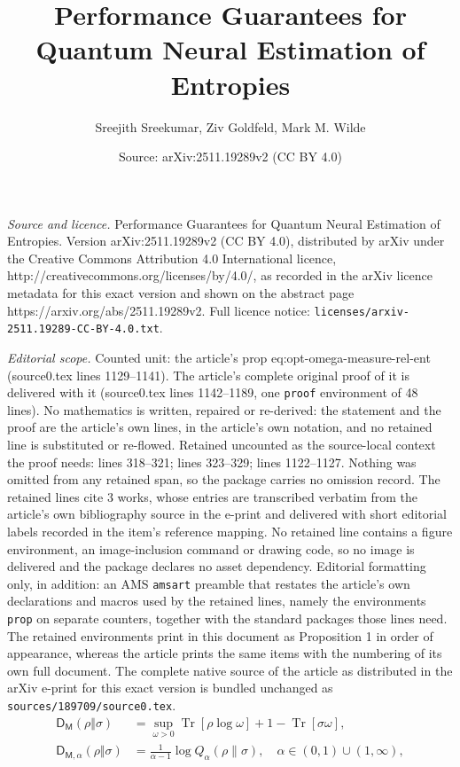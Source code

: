 \documentclass[10pt,a4paper]{amsart}
\title{Performance Guarantees for Quantum Neural Estimation of Entropies}
\author{Sreejith Sreekumar, Ziv Goldfeld, Mark M. Wilde}
\date{Source: arXiv:2511.19289v2 (CC BY 4.0)}
\DeclareMathOperator{\Tr}{Tr}
\newcommand{\sD}{\mathsf{D}}
\begin{document}
\maketitle

\noindent\emph{Source and licence.} Performance Guarantees for Quantum Neural Estimation of Entropies. Version arXiv:2511.19289v2 (CC BY 4.0), distributed by arXiv under the Creative Commons Attribution 4.0 International licence, http://creativecommons.org/licenses/by/4.0/, as recorded in the arXiv licence metadata for this exact version and shown on the abstract page https://arxiv.org/abs/2511.19289v2. Full licence notice: \texttt{licenses/arxiv-2511.19289-CC-BY-4.0.txt}.\par\smallskip

\noindent\textit{Editorial scope.} Counted unit: the article's prop eq:opt-omega-measure-rel-ent (source0.tex lines 1129--1141). The article's complete original proof of it is delivered with it (source0.tex lines 1142--1189, one \texttt{proof} environment of 48 lines). No mathematics is written, repaired or re-derived: the statement and the proof are the article's own lines, in the article's own notation, and no retained line is substituted or re-flowed.  Retained uncounted as the source-local context the proof needs: lines 318--321; lines 323--329; lines 1122--1127.  Nothing was omitted from any retained span, so the package carries no omission record.  The retained lines cite 3 works, whose entries are transcribed verbatim from the article's own bibliography source in the e-print and delivered with short editorial labels recorded in the item's reference mapping.  No retained line contains a figure environment, an image-inclusion command or drawing code, so no image is delivered and the package declares no asset dependency.  Editorial formatting only, in addition: an AMS \texttt{amsart} preamble that restates the article's own declarations and macros used by the retained lines, namely the environments \texttt{prop} on separate counters, together with the standard packages those lines need.  The retained environments print in this document as Proposition 1 in order of appearance, whereas the article prints the same items with the numbering of its own full document.  The complete native source of the article as distributed in the arXiv e-print for this exact version is bundled unchanged as \texttt{sources/189709/source0.tex}.
\begin{align}
\sD_{\mathsf{M}}(\rho\Vert\sigma)&=\sup_{\omega>0} \Tr[\rho\log\omega]+1-\Tr[\sigma\omega],\label{eq:measured-rel-ent-opt} \\
    \sD_{\mathsf{M},\alpha}(\rho\Vert\sigma)&= \frac{1}{\alpha-1} \log Q_{\alpha}(\rho\|\sigma), \quad \alpha \in (0,1) \cup (1,\infty), \label{eq:varformrenentmain2}
\end{align}
\end{document}
